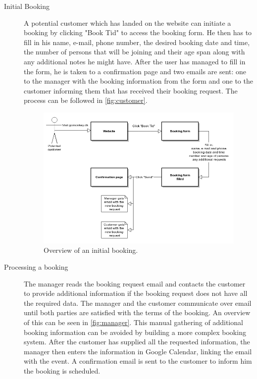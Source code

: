 \begin{description}
\item[Initial Booking]
A potential customer which has landed on the website can initiate a booking
by clicking "Book Tid" to access the booking form. He then has to fill in his name, e-mail, phone number, 
the desired booking date and time, the number of persons that will be joining and their
age span along with any additional notes he might have. 
After the user has managed to fill in the form, he is taken to a confirmation
page and two emails are sent: one to the manager with the booking information from the form and
one to the customer informing them that \gomonkey{} has received their booking request. The process
can be followed in \autoref{fig:customer}.

\begin{figure}[htbp]
    \centering
        \includegraphics[width=\textwidth]{figures/customer.png}
            \caption{Overview of an initial booking.}
        \label{fig:customer}
\end{figure}

\item[Processing a booking]
The manager reads the booking request email and contacts the customer to provide additional
information if the booking request does not have all the required data. The manager and the 
customer communicate over email until both parties are satisfied with the terms of the booking.
An overview of this can be seen in \autoref{fig:manager}. This manual gathering of additional
booking information can be avoided by building a more complex booking system. After the customer
has supplied all the requested information, the manager then enters the information in Google
Calendar, linking the email with the event. A confirmation email is sent to the customer to
inform him the booking is scheduled.


\end{description}
